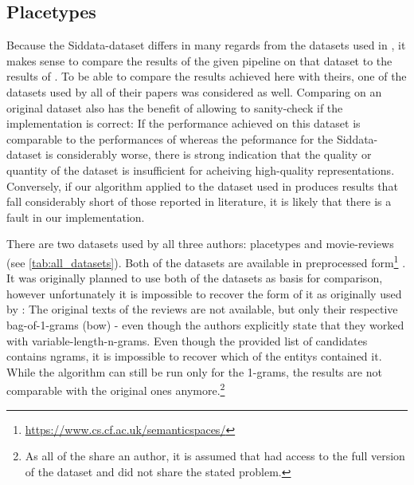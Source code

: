


\subsection{Placetypes}
\label{sec:dataset_placetypes}


Because the Siddata-dataset differs in many regards from the datasets used in \mainalgos, %
it makes sense to compare the results of the given pipeline on that dataset to the results of \mainalgos. To be able to compare the results achieved here with theirs, one of the datasets used by all of their papers was considered as well. Comparing on an original dataset also has the benefit of allowing to sanity-check if the implementation is correct: If the performance achieved on this dataset is comparable to the performances of \mainalgos whereas the peformance for the Siddata-dataset is considerably worse, there is strong indication that the quality or quantity of the dataset is insufficient for acheiving high-quality representations. Conversely, if our algorithm applied to the dataset used in \mainalgos produces results that fall considerably short of those reported in literature, it is likely that there is a fault in our implementation.

There are two datasets used by all three authors: placetypes and movie-reviews (see \autoref{tab:all_datasets}). Both of the datasets are available in preprocessed form\footnote{\url{https://www.cs.cf.ac.uk/semanticspaces/}} \cite{Derrac2015}. It was originally planned to use both of the datasets as basis for comparison, however unfortunately it is impossible to recover the form of it as originally used by \textcite{Derrac2015}: The original texts of the reviews are not available, but only their respective bag-of-1-grams (\gls{bow}) - even though the authors explicitly state that they worked with variable-length-n-grams. Even though the provided list of candidates contains \glspl{ngram}, it is impossible to recover which of the \glspl{entity} contained it. While the algorithm can still be run only for the 1-grams, the results are not comparable with the original ones anymore.\footnote{As all of the \mainalgos share an author, it is assumed that \cite{Alshaikh2020,Ager2018} had access to the full version of the dataset and did not share the stated problem.}


